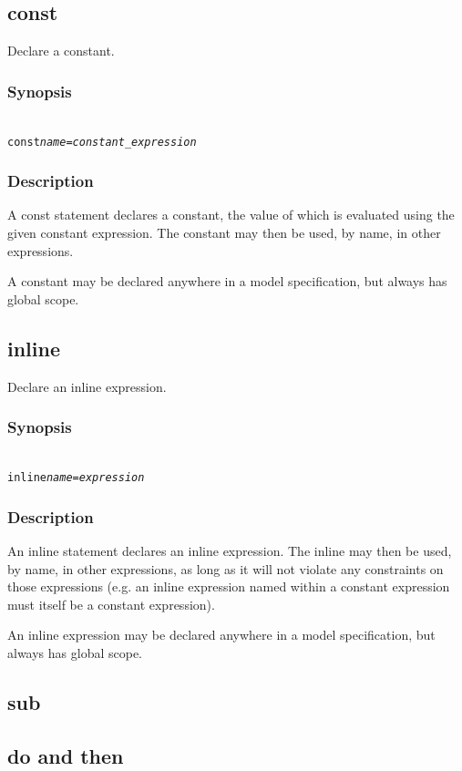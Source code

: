 \subsection{{\sf const}\label{const}}

Declare a constant.

\subsubsection*{Synopsis\label{const_Synopsis}}
\begin{alltt}{\sf
    const \textsl{name} = \textsl{constant_expression}
}\end{alltt}

\subsubsection*{Description\label{const_description}}

A {\sf const} statement declares a constant, the value of which is evaluated
using the given constant expression. The constant
may then be used, by name, in other expressions.

A constant may be declared anywhere in a model specification, but always has
global scope.

\subsection{{\sf inline}\label{inline}}

Declare an inline expression.

\subsubsection*{Synopsis\label{inline_synopsis}}
\begin{alltt}{\sf
    inline \textsl{name} = \textsl{expression}
}\end{alltt}

\subsubsection*{Description\label{inline_description}}

An {\sf inline} statement declares an inline expression. The inline may then be used, by name, in other expressions, as
long as it will not violate any constraints on those expressions (e.g. an
inline expression named within a constant expression must itself be a constant
expression).

An inline expression may be declared anywhere in a model specification, but
always has global scope.

\subsection{{\sf sub}\label{sub}}

\subsection{{\sf do} and {\sf then}\label{do_then}}
